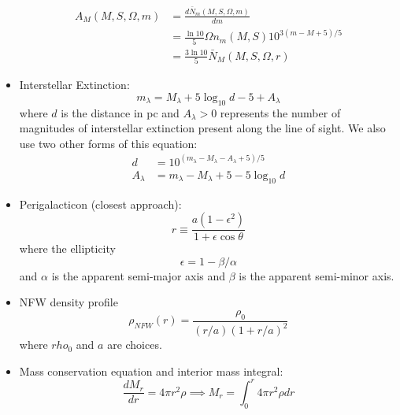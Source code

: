 \documentclass{book}
\begin{document}
\begin{itemize}
          \begin{align*}
              A_M (M, S, \Omega, m) & = \frac{d\bar{N}_m (M, S, \Omega, m)}{dm}                       \\
                                    & = \frac{\ln 10}{5} \Omega n_m (M, S) 10^{3(m - M +5)/5}         \\
                                    & = \frac{3 \ln 10}{5} \bar{N}_M(M, S, \Omega, r) \tag{C\&O 24.5}
          \end{align*}
    \item Interstellar Extinction:
          \begin{equation*}
              m_\lambda = M_\lambda + 5 \log_{10} d - 5 + A_\lambda \tag{C\&O 12.1}
          \end{equation*}
          where $d$ is the distance in pc and $A_\lambda > 0$ represents the number of magnitudes of interstellar extinction present along the line of sight. We also use two other forms of this equation:
          \begin{align*}
              d         & = 10^{(m_\lambda - M_\lambda - A_\lambda + 5)/5}            \\
              A_\lambda & = m_\lambda - M_\lambda + 5 - 5 \log_{10} d \tag{C\&O 24.1}
          \end{align*}
    \item Perigalacticon (closest approach):
          \begin{equation*}
              r \equiv \frac{a (1 - \epsilon^2)}{1 + \epsilon \cos \theta}
          \end{equation*}
          where the ellipticity
          \begin{equation*}
              \epsilon = 1 - \beta/\alpha \tag{C\&O 25.1}
          \end{equation*}
          and $\alpha$ is the apparent semi-major axis and $\beta$ is the apparent semi-minor axis.
    \item NFW density profile
          \begin{equation*}
              \rho_{NFW} (r) = \frac{\rho_0}{(r/a)(1+r/a)^2} \tag{C\&O 24.52}
          \end{equation*}
          where $rho_0$ and $a$ are choices.
    \item Mass conservation equation and interior mass integral:
          \begin{equation*}
              \frac{dM_r}{dr} = 4 \pi r^2 \rho \implies M_r = \int_0^r 4 \pi r^2 \rho dr \tag{C\&O 10.7}
          \end{equation*}

\end{itemize}
\end{document}
